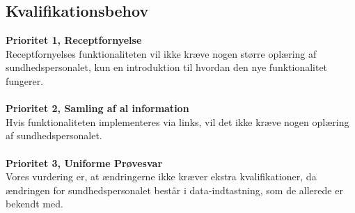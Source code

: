 \subsection{Kvalifikationsbehov}
\textbf{Prioritet 1, Receptfornyelse} \\
Receptfornyelses funktionaliteten vil ikke kræve nogen større oplæring af sundhedspersonalet, kun en introduktion til hvordan den nye funktionalitet fungerer.
\\\\
\textbf{Prioritet 2, Samling af al information} \\
Hvis funktionaliteten implementeres via links, vil det ikke kræve nogen oplæring af sundhedspersonalet.
\\\\
\textbf{Prioritet 3, Uniforme Prøvesvar} \\
Vores vurdering er, at ændringerne ikke kræver ekstra kvalifikationer, da ændringen for sundhedspersonalet består i data-indtastning, som de allerede er bekendt med.